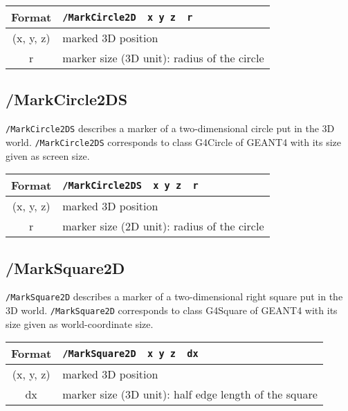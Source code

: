 \begin{tabular}{|c|l|}
\hline%
Format     & \verb+/MarkCircle2D  x y z  r+\\
\hline%
(x, y, z)  &  marked 3D position\\
\hline%
r          &  marker size (3D unit): radius of the circle  \\
\hline%
\end{tabular}


\subsection{/MarkCircle2DS}
\verb+/MarkCircle2DS+ describes a marker of a two-dimensional circle
put in the 3D world.
\verb+/MarkCircle2DS+ corresponds to class G4Circle of GEANT4 with
its size given as screen size.
\vspace{.20in}

\begin{tabular}{|c|l|}
\hline%
Format     & \verb+/MarkCircle2DS  x y z  r+\\
\hline%
(x, y, z)  &  marked 3D position\\
\hline%
r          &  marker size (2D unit): radius of the circle     \\
\hline%
\end{tabular}

\subsection{/MarkSquare2D}  
\verb+/MarkSquare2D+ describes a marker of a two-dimensional right square  
put in the 3D world.
\verb+/MarkSquare2D+ corresponds to class G4Square of GEANT4 with
its size given as world-coordinate size.
\vspace{.20in}

\begin{tabular}{|c|l|}
\hline%
Format     & \verb+/MarkSquare2D  x y z  dx+\\
\hline%
(x, y, z)  &  marked 3D position  \\
\hline%
dx         &  marker size (3D unit): half edge length of the square \\
\hline%
\end{tabular}


